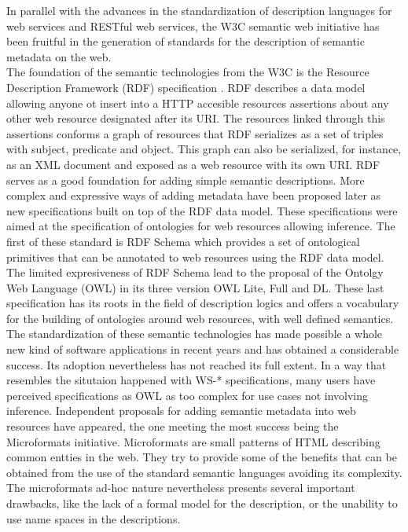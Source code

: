 In parallel with the advances in the standardization of description languages for web services and RESTful web services,
the W3C semantic web initiative has been fruitful in the generation of standards for the description of semantic
metadata on the web.\\

The foundation of the semantic technologies from the W3C is the Resource Description Framework (RDF) specification \cite{Hayes:04:RS}. RDF describes a
data model allowing anyone ot insert into a HTTP accesible resources assertions about any other web resource designated
after its URI. The resources linked through this assertions conforms a graph of resources that RDF serializes as a set
of triples with subject, predicate and object. This graph can also be serialized, for instance,  as an XML document \cite{rdfxml} and
exposed as a web resource with its own URI. RDF serves as a good foundation for adding simple semantic
descriptions. More complex and expressive ways of adding metadata  have been proposed later as new specifications built
on top of the RDF data model. These specifications were aimed at the specification of ontologies for web resources
allowing inference. The
first of these standard is RDF Schema \cite{Brickley:04:RVD} which provides a set of ontological primitives that can be
annotated to web resources using the RDF data model. The limited expresiveness of RDF Schema lead to the proposal of the
Ontolgy Web Language (OWL) \cite{Dean:04:OWO} in its three version OWL Lite, Full and DL. These last specification has
its roots in the field of description logics and offers a vocabulary for the building of ontologies around web
resources, with well defined semantics.\\

The standardization of these semantic technologies has made possible a whole new kind of software applications in recent
years and has obtained a considerable success. Its adoption nevertheless has not reached its full extent. In a way that
resembles the situtaion happened with WS-* specifications, many users have perceived specifications as OWL as too complex for
use cases not involving inference. Independent proposals for adding semantic metadata into web resources have appeared,
the one meeting the most success being the Microformats initiative. Microformats are small patterns of HTML describing
common entties in the web. They try to provide some of the benefits that can be obtained from the use of the standard
semantic languages avoiding its complexity. The microformats ad-hoc nature nevertheless presents several important drawbacks,
like the lack of a formal model for the description, or the unability to use name spaces in the descriptions.\\

